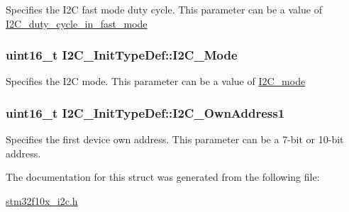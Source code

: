 \label{structI2C__InitTypeDef_aff23b28652359513dfd268dee54c3279}
Specifies the I2C fast mode duty cycle. This parameter can be a value of \hyperlink{group__I2C__duty__cycle__in__fast__mode}{I2C\_\-duty\_\-cycle\_\-in\_\-fast\_\-mode} \hypertarget{structI2C__InitTypeDef_ad5cf353c5b6968b3610b70ca593cec52}{
\subsubsection[{I2C\_\-Mode}]{\setlength{\rightskip}{0pt plus 5cm}uint16\_\-t {\bf I2C\_\-InitTypeDef::I2C\_\-Mode}}}
\label{structI2C__InitTypeDef_ad5cf353c5b6968b3610b70ca593cec52}
Specifies the I2C mode. This parameter can be a value of \hyperlink{group__I2C__mode}{I2C\_\-mode} \hypertarget{structI2C__InitTypeDef_a08543cb71b4b2a89ad81a2cefff12b53}{
\subsubsection[{I2C\_\-OwnAddress1}]{\setlength{\rightskip}{0pt plus 5cm}uint16\_\-t {\bf I2C\_\-InitTypeDef::I2C\_\-OwnAddress1}}}
\label{structI2C__InitTypeDef_a08543cb71b4b2a89ad81a2cefff12b53}
Specifies the first device own address. This parameter can be a 7-\/bit or 10-\/bit address. 

The documentation for this struct was generated from the following file:\begin{DoxyCompactItemize}
\item 
\hyperlink{stm32f10x__i2c_8h}{stm32f10x\_\-i2c.h}\end{DoxyCompactItemize}
